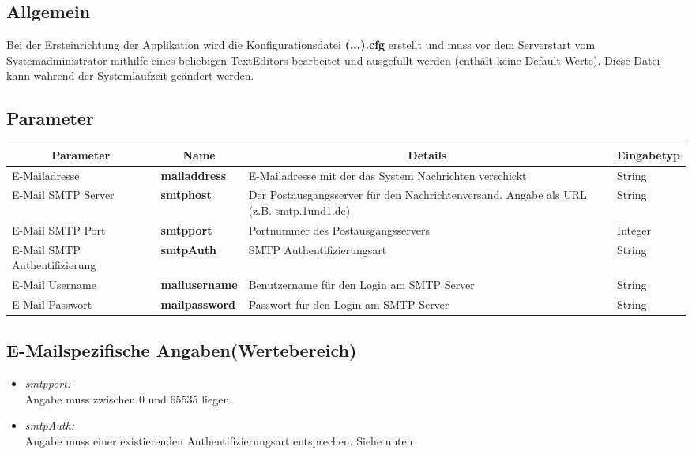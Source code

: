 \subsection{Allgemein}
Bei der Ersteinrichtung der Applikation wird die Konfigurationsdatei \textbf{(...).cfg} erstellt und muss vor dem Serverstart vom Systemadministrator mithilfe eines beliebigen TextEditors bearbeitet und ausgefüllt werden (enthält keine Default Werte). Diese Datei kann während der Systemlaufzeit geändert werden.

\subsection{Parameter}
\begin{center}
	\begin{longtable}{|p{4cm} | p{3cm}| p{7cm} | p{2cm} |}
		\hline
		\multicolumn{1}{|c|}{\textbf{Parameter}} & \multicolumn{1}{c|}{\textbf{Name}} & \multicolumn{1}{c|}{\textbf{Details}} & \multicolumn{1}{c|}{\textbf{Eingabetyp}}
		\\ \hline
		E-Mailadresse & \textbf{mailaddress} & E-Mailadresse mit der das System Nachrichten verschickt & String \\ \hline
		E-Mail SMTP Server & \textbf{smtphost} & Der Postausgangsserver für den Nachrichtenversand. Angabe als URL (z.B. smtp.1und1.de) & String \\ \hline
		E-Mail SMTP Port & \textbf{smtpport} & Portnummer des Postausgangsservers & Integer \\ \hline
		E-Mail SMTP Authentifizierung & \textbf{smtpAuth} & SMTP Authentifizierungsart & String  \\ \hline
		E-Mail Username & \textbf{mailusername} & Benutzername für den Login am SMTP Server & String \\ \hline
		E-Mail Passwort & \textbf{mailpassword} & Passwort für den Login am SMTP Server & String \\ \hline
		
	\end{longtable}
\end{center}
\subsection{E-Mailspezifische Angaben(Wertebereich)}

\begin{itemize}
	\item \emph{smtpport:}\\
	Angabe muss zwischen 0 und 65535 liegen.
	\item \emph{smtpAuth:}\\
	Angabe muss einer existierenden Authentifizierungsart entsprechen. Siehe unten
\end{itemize}

